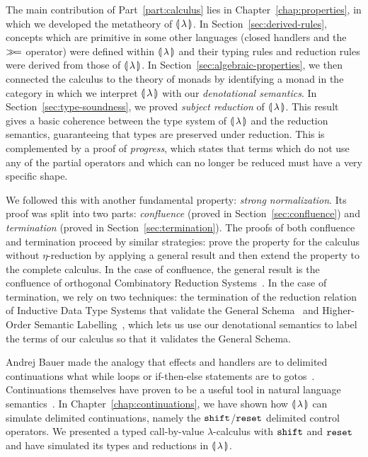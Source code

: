 The main contribution of Part~\ref{part:calculus} lies in
Chapter~\ref{chap:properties}, in which we developed the metatheory of
${\llparenthesis \, \lambda \, \rrparenthesis}$. In Section~\ref{sec:derived-rules}, concepts which are primitive
in some other languages (closed handlers and the $\mathbin{\gg\!=}$ operator) were
defined within ${\llparenthesis \, \lambda \, \rrparenthesis}$ and their typing rules and reduction rules were
derived from those of ${\llparenthesis \, \lambda \, \rrparenthesis}$. In Section~\ref{sec:algebraic-properties},
we then connected the calculus to the theory of monads by identifying a
monad in the category in which we interpret ${\llparenthesis \, \lambda \, \rrparenthesis}$ with our
\emph{denotational semantics}. In Section~\ref{sec:type-soundness}, we
proved \emph{subject reduction} of ${\llparenthesis \, \lambda \, \rrparenthesis}$. This result gives a basic
coherence between the type system of ${\llparenthesis \, \lambda \, \rrparenthesis}$ and the reduction semantics,
guaranteeing that types are preserved under reduction.  This is
complemented by a proof of \emph{progress}, which states that terms which
do not use any of the partial operators and which can no longer be reduced
must have a very specific shape.

We followed this with another fundamental property: \emph{strong
  normalization}. Its proof was split into two parts: \emph{confluence}
(proved in Section~\ref{sec:confluence}) and \emph{termination} (proved in
Section~\ref{sec:termination}). The proofs of both confluence and
termination proceed by similar strategies: prove the property for the
calculus without $\eta$-reduction by applying a general result and then
extend the property to the complete calculus. In the case of confluence,
the general result is the confluence of orthogonal Combinatory Reduction
Systems~\cite{klop1993combinatory}. In the case of termination, we rely on
two techniques: the termination of the reduction relation of Inductive Data
Type Systems that validate the General Schema~\cite{blanqui2000termination}
and Higher-Order Semantic Labelling~\cite{hamana2007higher}, which lets us
use our denotational semantics to label the terms of our calculus so that
it validates the General Schema.

Andrej Bauer made the analogy that effects and handlers are to delimited
continuations what while loops or if-then-else statements are to
gotos~\cite{bauer2012lambda}. Continuations themselves have proven to be a
useful tool in natural language
semantics~\cite{de2001type,barker2002continuations,shan2005linguistic,de2006towards,barker2006continuations,barker2014continuations}. In
Chapter~\ref{chap:continuations}, we have shown how ${\llparenthesis \, \lambda \, \rrparenthesis}$ can simulate
delimited continuations, namely the $\mathtt{shift}$/$\mathtt{reset}$ delimited control
operators. We presented a typed call-by-value $\lambda$-calculus with
$\mathtt{shift}$ and $\mathtt{reset}$ and have simulated its types and reductions in
${\llparenthesis \, \lambda \, \rrparenthesis}$.

